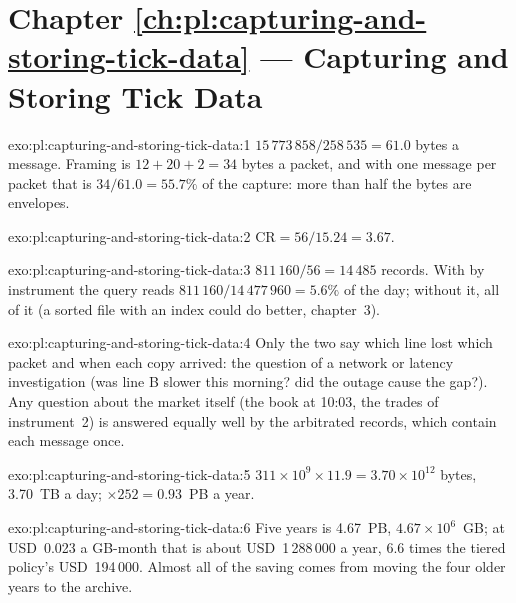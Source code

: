 \section*{Chapter \ref{ch:pl:capturing-and-storing-tick-data} --- Capturing and Storing Tick Data}

\begin{solution}{exo:pl:capturing-and-storing-tick-data:1}
$15\,773\,858 / 258\,535 = 61.0$ bytes a message. Framing is $12 + 20 + 2 = 34$ bytes a packet, and with one message per packet
that is $34/61.0 = 55.7\%$ of the capture: more than half the bytes are envelopes.
\end{solution}

\begin{solution}{exo:pl:capturing-and-storing-tick-data:2}
$\mathrm{CR} = 56 / 15.24 = 3.67$.
\end{solution}

\begin{solution}{exo:pl:capturing-and-storing-tick-data:3}
$811\,160 / 56 = 14\,485$ records. With  by instrument the query reads $811\,160 / 14\,477\,960 = 5.6\%$ of the day;
without it, all of it (a sorted file with an index could do better, chapter~3).
\end{solution}

\begin{solution}{exo:pl:capturing-and-storing-tick-data:4}
Only the two  say which line lost which packet and when each copy arrived: the question of a network or latency
investigation (was line B slower this morning? did the outage cause the gap?). Any question about the market itself (the book
at 10:03, the trades of instrument~2) is answered equally well by the arbitrated records, which contain each message once.
\end{solution}

\begin{solution}{exo:pl:capturing-and-storing-tick-data:5}
$311\times10^9 \times 11.9 = 3.70\times10^{12}$ bytes, 3.70~TB a day; $\times 252 = 0.93$~PB a year.
\end{solution}

\begin{solution}{exo:pl:capturing-and-storing-tick-data:6}
Five years is 4.67~PB, $4.67\times10^6$~GB; at USD~0.023 a GB-month that is about USD~1\,288\,000 a year, 6.6 times the tiered
policy's USD~194\,000. Almost all of the saving comes from moving the four older years to the archive.
\end{solution}

